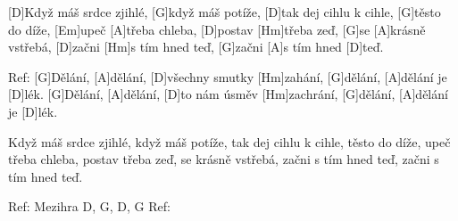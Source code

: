 

[D]Když máš srdce zjihlé, [G]když máš potíže, 
[D]tak dej cihlu k cihle, [G]těsto do díže, 
[Em]upeč [A]třeba chleba, [D]postav [Hm]třeba zeď,
[G] se [A]krásně vstřebá, 
[D]začni [Hm]s tím hned teď, 
[G]začni [A]s tím hned [D]teď.

Ref: [G]Dělání, [A]dělání, [D]všechny smutky [Hm]zahání, 
[G]dělání, [A]dělání je [D]lék.
[G]Dělání, [A]dělání, [D]to nám úsměv [Hm]zachrání, 
[G]dělání, [A]dělání je [D]lék.

Když máš srdce zjihlé, když máš potíže, 
tak dej cihlu k cihle, těsto do díže, 
upeč třeba chleba, postav třeba zeď,
 se krásně vstřebá, začni s tím hned teď, 
začni s tím hned teď.

Ref: 
Mezihra D, G, D, G
Ref: 